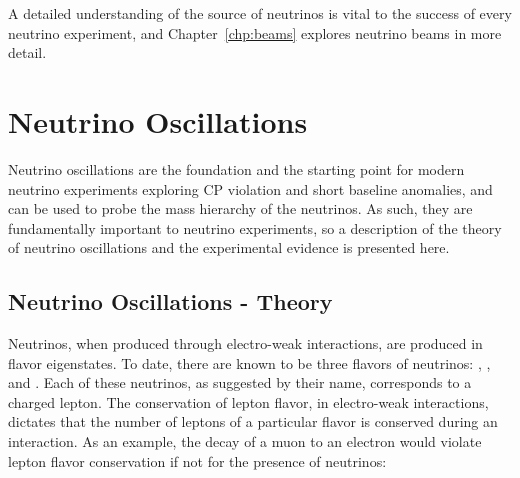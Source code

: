 A detailed understanding of the source of neutrinos is vital to the success of every neutrino experiment, and Chapter~\ref{chp:beams} explores neutrino beams in more detail.







\section{Neutrino Oscillations}

Neutrino oscillations \cite{Bilenky:1978nj, Maki:1962mu, Langacker:1988up} are the foundation and the starting point for modern neutrino experiments exploring CP violation and short baseline anomalies, and can be used to probe the mass hierarchy of the neutrinos.  As such, they are fundamentally important to neutrino experiments, so a description of the theory of neutrino oscillations and the experimental evidence is presented here.

\subsection{Neutrino Oscillations - Theory}


Neutrinos, when produced through electro-weak interactions, are produced in flavor eigenstates.  To date, there are known to be three flavors of neutrinos: \nue, \numu, and \nutau.  Each of these neutrinos, as suggested by their name, corresponds to a charged lepton.  The conservation of lepton flavor, in electro-weak interactions, dictates that the number of leptons of a particular flavor is conserved during an interaction.  As an example, the decay of a muon to an electron would violate lepton flavor conservation if not for the presence of neutrinos:

